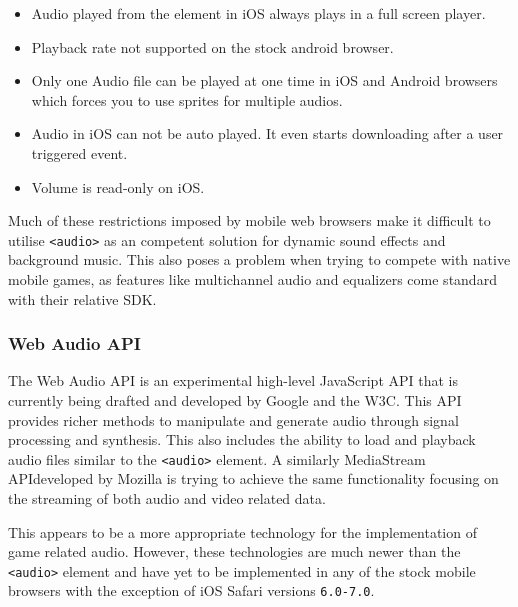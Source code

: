 \documentclass[final]{cmpreport}
\begin{document}

\begin{itemize}
  \item Audio played from the element in iOS always plays in a full screen player.
  \item Playback rate not supported on the stock android browser.
  \item Only one Audio file can be played at one time in iOS and Android browsers which forces you to use sprites for multiple audios.
  \item Audio in iOS can not be auto played. It even starts downloading after a user triggered event.
  \item Volume is read-only on iOS.
\end{itemize}

Much of these restrictions imposed by mobile web browsers make it difficult to utilise \texttt{<audio>} as an competent solution for dynamic sound effects and background music. This also poses a problem when trying to compete with native mobile games, as features like multichannel audio and equalizers come standard with their relative SDK.

\subsubsection{Web Audio API}
The Web Audio API is an experimental high-level JavaScript API that is currently being drafted and developed by Google and the W3C\footnotemark[18]. This API provides richer methods to manipulate and generate audio through signal processing and synthesis. This also includes the ability to load and playback audio files similar to the \texttt{<audio>} element. A similarly MediaStream API\footnotemark[19] developed by Mozilla is trying to achieve the same functionality focusing on the streaming of both audio and video related data.


This appears to be a more appropriate technology for the implementation of game related audio. However, these technologies are much newer than the \texttt{<audio>} element and have yet to be implemented in any of the stock mobile browsers with the exception of iOS Safari versions \texttt{6.0-7.0}\footnotemark[20].
\end{document}
